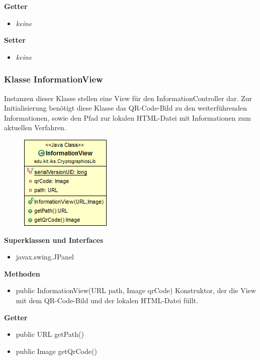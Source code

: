 \documentclass{article}
\begin{document}
      \textbf{Getter}
      \begin{itemize}
		\item \textit{keine}
      \end{itemize}
      
      \textbf{Setter}
      \begin{itemize}
        \item \textit{keine}
      \end{itemize}
	
	\subsubsection{Klasse InformationView}
	  Instanzen dieser Klasse stellen eine View für den InformationController dar.
	  Zur Initialisierung benötigt diese Klasse das QR-Code-Bild zu den weiterführenden 
	  Informationen, sowie den Pfad zur lokalen HTML-Datei mit Informationen zum
	  aktuellen Verfahren.
	
      \begin{figure}[H]
        \centering
        \includegraphics{resources/edu-kit-iks-CryptographicsLib-InformationView}
      \end{figure}
	
      \textbf{Superklassen und Interfaces}
      \begin{itemize}
        \item javax.swing.JPanel
      \end{itemize}
	
      \textbf{Methoden}
      \begin{itemize}
        \item public InformationView(URL path, Image qrCode) \newline
          Konstruktor, der die View mit dem QR-Code-Bild und der lokalen HTML-Datei füllt.
      \end{itemize}
      
      \textbf{Getter}
      \begin{itemize}
		\item public URL getPath()
		\item public Image getQrCode()
      \end{itemize}
      
\end{document}
